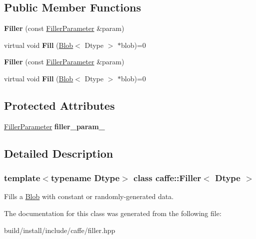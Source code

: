 \subsection*{Public Member Functions}
\begin{DoxyCompactItemize}
\item 
\mbox{\label{classcaffe_1_1_filler_aff156b1d4e5dbbbad720aa776df44512}} 
{\bfseries Filler} (const \mbox{\hyperlink{classcaffe_1_1_filler_parameter}{Filler\+Parameter}} \&param)
\item 
\mbox{\label{classcaffe_1_1_filler_acd02177b669381252a7c484f51432d30}} 
virtual void {\bfseries Fill} (\mbox{\hyperlink{classcaffe_1_1_blob}{Blob}}$<$ Dtype $>$ $\ast$blob)=0
\item 
\mbox{\label{classcaffe_1_1_filler_aff156b1d4e5dbbbad720aa776df44512}} 
{\bfseries Filler} (const \mbox{\hyperlink{classcaffe_1_1_filler_parameter}{Filler\+Parameter}} \&param)
\item 
\mbox{\label{classcaffe_1_1_filler_acd02177b669381252a7c484f51432d30}} 
virtual void {\bfseries Fill} (\mbox{\hyperlink{classcaffe_1_1_blob}{Blob}}$<$ Dtype $>$ $\ast$blob)=0
\end{DoxyCompactItemize}
\subsection*{Protected Attributes}
\begin{DoxyCompactItemize}
\item 
\mbox{\label{classcaffe_1_1_filler_a1ded14cf43eeb7b45628770842c4348c}} 
\mbox{\hyperlink{classcaffe_1_1_filler_parameter}{Filler\+Parameter}} {\bfseries filler\+\_\+param\+\_\+}
\end{DoxyCompactItemize}


\subsection{Detailed Description}
\subsubsection*{template$<$typename Dtype$>$\newline
class caffe\+::\+Filler$<$ Dtype $>$}

Fills a \mbox{\hyperlink{classcaffe_1_1_blob}{Blob}} with constant or randomly-\/generated data. 

The documentation for this class was generated from the following file\+:\begin{DoxyCompactItemize}
\item 
build/install/include/caffe/filler.\+hpp\end{DoxyCompactItemize}
